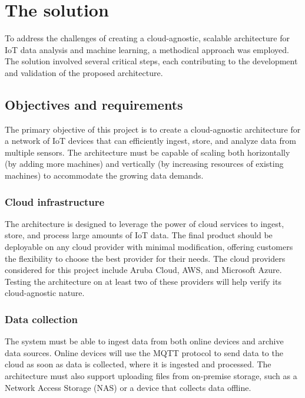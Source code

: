 \section{The solution}
\label{sec:the-solution}
To address the challenges of creating a cloud-agnostic, scalable architecture for IoT data analysis and machine learning, a methodical approach was employed. The solution involved several critical steps, each contributing to the development and validation of the proposed architecture. 

\subsection{Objectives and requirements}
\label{sec:objectives-and-requirements}
The primary objective of this project is to create a cloud-agnostic architecture for a network of IoT devices that can efficiently ingest, store, and analyze data from multiple sensors. The architecture must be capable of scaling both horizontally (by adding more machines) and vertically (by increasing resources of existing machines) to accommodate the growing data demands.

\subsubsection{Cloud infrastructure}
\label{sec:cloud-infrastructure}
The architecture is designed to leverage the power of cloud services to ingest, store, and process large amounts of IoT data. The final product should be deployable on any cloud provider with minimal modification, offering customers the flexibility to choose the best provider for their needs. The cloud providers considered for this project include Aruba Cloud\cite{site:aruba-cloud}, AWS\cite{site:aws}, and Microsoft Azure\cite{site:azure}. Testing the architecture on at least two of these providers will help verify its cloud-agnostic nature.

\subsubsection{Data collection}
\label{sec:data-collection}
The system must be able to ingest data from both online devices and archive data sources. Online devices will use the MQTT protocol to send data to the cloud as soon as data is collected, where it is ingested and processed. The architecture must also support uploading files from on-premise storage, such as a Network Access Storage (NAS) or a device that collects data offline.

